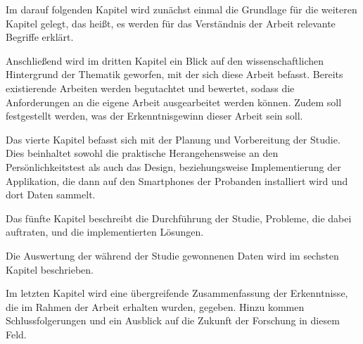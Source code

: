 Im darauf folgenden Kapitel wird zunächst einmal die Grundlage für die weiteren Kapitel gelegt, das heißt,
es werden für das Verständnis der Arbeit relevante Begriffe erklärt.
\par


Anschließend wird im dritten Kapitel ein Blick auf den wissenschaftlichen Hintergrund der Thematik geworfen, mit der sich diese Arbeit befasst.
Bereits existierende Arbeiten werden begutachtet und bewertet, sodass die Anforderungen an die eigene Arbeit ausgearbeitet werden können.
Zudem soll festgestellt werden, was der Erkenntnisgewinn dieser Arbeit sein soll.
\par

Das vierte Kapitel befasst sich mit der Planung und Vorbereitung der Studie.
Dies beinhaltet sowohl die praktische Herangehensweise an den Persönlichkeitstest als auch das Design, beziehungsweise Implementierung der Applikation,
die dann auf den Smartphones der Probanden installiert wird und dort Daten sammelt. 

Das fünfte Kapitel beschreibt die Durchführung der Studie, Probleme, die dabei auftraten, und die implementierten Lösungen.

Die Auswertung der während der Studie gewonnenen Daten wird im sechsten Kapitel beschrieben.

Im letzten Kapitel wird eine übergreifende Zusammenfassung der Erkenntnisse, die im Rahmen der Arbeit erhalten wurden, gegeben.
Hinzu kommen Schlussfolgerungen und ein Ausblick auf die Zukunft der Forschung in diesem Feld.


